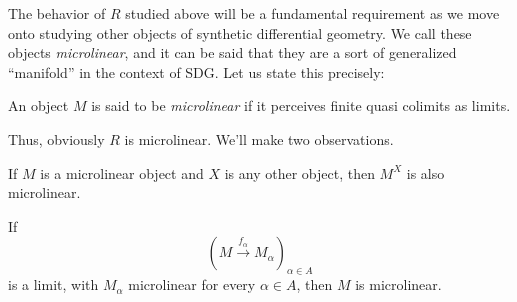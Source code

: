 The behavior of \( R \) studied above will be a fundamental requirement as we move onto studying other objects of synthetic differential geometry. We call these objects \emph{microlinear}, and it can be said that they are a sort of generalized ``manifold'' in the context of SDG. Let us state this precisely:

\begin{defn}
  An object \( M \) is said to be \emph{microlinear} if it perceives finite quasi colimits as limits.
\end{defn}

Thus, obviously \( R \) is microlinear. We'll make two observations.

\begin{proposition}
  If \( M \) is a microlinear object and \( X \) is any other object, then \( M^X \) is also microlinear.
  \label{prop:expmicro}
\end{proposition}

\begin{proposition}
  If
  \begin{equation*}
    \left( M\stackrel{f_\alpha}{\longrightarrow} M_\alpha \right)_{\alpha\in A}
  \end{equation*}
  is a limit, with \( M_\alpha \) microlinear for every \( \alpha\in A \), then \( M \) is microlinear.
  \label{prop:limmicro}
\end{proposition}

